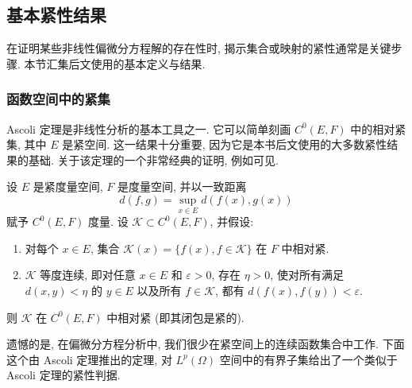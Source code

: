 \subsection{基本紧性结果}
\label{sec:chap2-compactness}
\renewcommand{\thestatement}{3.\number\numexpr\value{statement}-47\relax}

在证明某些非线性偏微分方程解的存在性时, 揭示集合或映射的紧性通常是关键步骤. 本节汇集后文使用的基本定义与结果.

\subsubsection{函数空间中的紧集}
\label{subsec:chap2-compact-sets-function-spaces}

Ascoli 定理是非线性分析的基本工具之一. 它可以简单刻画 $C^0(E,F)$ 中的相对紧集, 其中 $E$ 是紧空间. 这一结果十分重要, 因为它是本书后文使用的大多数紧性结果的基础. 关于该定理的一个非常经典的证明, 例如可见.

\begin{Theorem}[Ascoli]
\label{thm:chap2-ascoli}
设 $E$ 是紧度量空间, $F$ 是度量空间, 并以一致距离
\[
 d(f,g)=\sup_{x\in E}d(f(x),g(x))
\]
赋予 $C^0(E,F)$ 度量. 设 $\mathcal{K}\subset C^0(E,F)$, 并假设:
\begin{enumerate}
\item 对每个 $x\in E$, 集合 $\mathcal{K}(x)=\{f(x),f\in\mathcal{K}\}$ 在 $F$ 中相对紧.
\item $\mathcal{K}$ 等度连续, 即对任意 $x\in E$ 和 $\varepsilon>0$, 存在 $\eta>0$, 使对所有满足 $d(x,y)<\eta$ 的 $y\in E$ 以及所有 $f\in\mathcal{K}$, 都有 $d(f(x),f(y))<\varepsilon$.
\end{enumerate}
则 $\mathcal{K}$ 在 $C^0(E,F)$ 中相对紧 (即其闭包是紧的).
\end{Theorem}

遗憾的是, 在偏微分方程分析中, 我们很少在紧空间上的连续函数集合中工作. 下面这个由 Ascoli 定理推出的定理, 对 $L^p(\Omega)$ 空间中的有界子集给出了一个类似于 Ascoli 定理的紧性判据.


